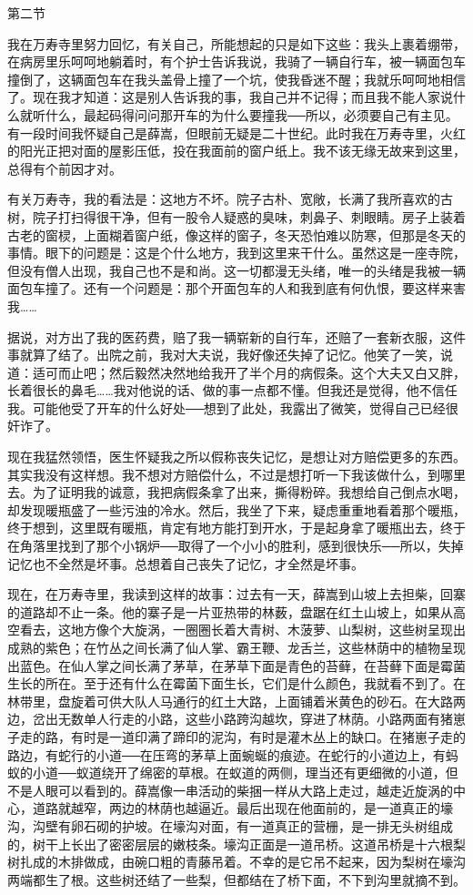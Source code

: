 第二节 

我在万寿寺里努力回忆，有关自己，所能想起的只是如下这些：我头上裹着绷带，在病房里乐呵呵地躺着时，有个护士告诉我说，我骑了一辆自行车，被一辆面包车撞倒了，这辆面包车在我头盖骨上撞了一个坑，使我昏迷不醒；我就乐呵呵地相信了。现在我才知道：这是别人告诉我的事，我自己并不记得；而且我不能人家说什么就听什么，最起码得问问那开车的为什么要撞我──所以，必须要自己有主见。有一段时间我怀疑自己是薛嵩，但眼前无疑是二十世纪。此时我在万寿寺里，火红的阳光正把对面的屋影压低，投在我面前的窗户纸上。我不该无缘无故来到这里，总得有个前因才对。 

有关万寿寺，我的看法是：这地方不坏。院子古朴、宽敞，长满了我所喜欢的古树，院子打扫得很干净，但有一股令人疑惑的臭味，刺鼻子、刺眼睛。房子上装着古老的窗棂，上面糊着窗户纸，像这样的窗子，冬天恐怕难以防寒，但那是冬天的事情。眼下的问题是：这是个什么地方，我到这里来干什么。虽然这是一座寺院，但没有僧人出现，我自己也不是和尚。这一切都漫无头绪，唯一的头绪是我被一辆面包车撞了。还有一个问题是：那个开面包车的人和我到底有何仇恨，要这样来害我…… 

据说，对方出了我的医药费，赔了我一辆崭新的自行车，还赔了一套新衣服，这件事就算了结了。出院之前，我对大夫说，我好像还失掉了记忆。他笑了一笑，说道：适可而止吧；然后毅然决然地给我开了半个月的病假条。这个大夫又白又胖，长着很长的鼻毛……我对他说的话、做的事一点都不懂。但我还是觉得，他不信任我。可能他受了开车的什么好处──想到了此处，我露出了微笑，觉得自己已经很奸诈了。 

现在我猛然领悟，医生怀疑我之所以假称丧失记忆，是想让对方赔偿更多的东西。其实我没有这样想。我不想对方赔偿什么，不过是想打听一下我该做什么，到哪里去。为了证明我的诚意，我把病假条拿了出来，撕得粉碎。我想给自己倒点水喝，却发现暖瓶盛了一些污浊的冷水。然后，我坐了下来，疑虑重重地看着那个暖瓶，终于想到，这里既有暖瓶，肯定有地方能打到开水，于是起身拿了暖瓶出去，终于在角落里找到了那个小锅炉──取得了一个小小的胜利，感到很快乐──所以，失掉记忆也不全然是坏事。总想着自己丧失了记忆，才全然是坏事。 

现在，在万寿寺里，我读到这样的故事：过去有一天，薛嵩到山坡上去担柴，回寨的道路却不止一条。他的寨子是一片亚热带的林薮，盘踞在红土山坡上，如果从高空看去，这地方像个大旋涡，一圈圈长着大青树、木菠萝、山梨树，这些树呈现出成熟的紫色；在竹丛之间长满了仙人掌、霸王鞭、龙舌兰，这些林荫中的植物呈现出蓝色。在仙人掌之间长满了茅草，在茅草下面是青色的苔藓，在苔藓下面是霉菌生长的所在。至于还有什么在霉菌下面生长，它们是什么颜色，我就看不到了。在林带里，盘旋着可供大队人马通行的红土大路，上面铺着米黄色的砂石。在大路两边，岔出无数单人行走的小路，这些小路跨沟越坎，穿进了林荫。小路两面有猪崽子走的路，有时是一道印满了蹄印的泥沟，有时是灌木丛上的缺口。在猪崽子走的路边，有蛇行的小道──在压弯的茅草上面蜿蜒的痕迹。在蛇行的小道边上，有蚂蚁的小道──蚁道绕开了绵密的草根。在蚁道的两侧，理当还有更细微的小道，但不是人眼可以看到的。薛嵩像一串活动的柴捆一样从大路上走过，越走近旋涡的中心，道路就越窄，两边的林荫也越逼近。最后出现在他面前的，是一道真正的壕沟，沟壁有卵石砌的护坡。在壕沟对面，有一道真正的营栅，是一排无头树组成的，树干上长出了密密层层的嫩枝条。壕沟正面是一道吊桥。这道吊桥是十六根梨树扎成的木排做成，由碗口粗的青藤吊着。不幸的是它吊不起来，因为梨树在壕沟两端都生了根。这些树还结了一些梨，但都结在了桥下面，不下到沟里就摘不到。 

